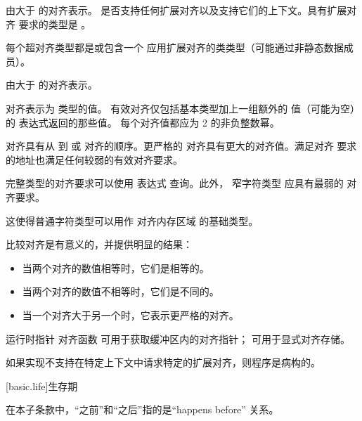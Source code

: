 \pnum
{} 由大于  的对齐表示。 
是否支持任何扩展对齐以及支持它们的上下文。具有扩展对齐
要求的类型是 。
\begin{note}
每个超对齐类型都是或包含一个
应用扩展对齐的类类型（可能通过非静态数据成员）。
\end{note}
 由大于  的对齐表示。

\pnum
对齐表示为  类型的值。
有效对齐仅包括基本类型加上一组额外的 
值（可能为空）的  表达式返回的那些值。
每个对齐值都应为 2 的非负整数幂。

\pnum
对齐具有从  到
 或  对齐的顺序。更严格的
对齐具有更大的对齐值。满足对齐
要求的地址也满足任何较弱的有效对齐要求。

\pnum
完整类型的对齐要求可以使用
 表达式 查询。此外，
窄字符类型 应具有最弱的
对齐要求。
\begin{note}
这使得普通字符类型可以用作
对齐内存区域 的基础类型。
\end{note}

\pnum
比较对齐是有意义的，并提供明显的结果：

\begin{itemize}
\item 当两个对齐的数值相等时，它们是相等的。
\item 当两个对齐的数值不相等时，它们是不同的。
\item 当一个对齐大于另一个时，它表示更严格的对齐。
\end{itemize}

\pnum
\begin{note}
运行时指针
对齐函数
可用于获取缓冲区内的对齐指针；
可用于显式对齐存储。
\end{note}

\pnum
如果实现不支持在特定上下文中请求特定的扩展对齐，则程序是病构的。

[basic.life]{生存期}

\pnum
在本子条款中，“之前”和“之后”指的是“happens before”
关系。

